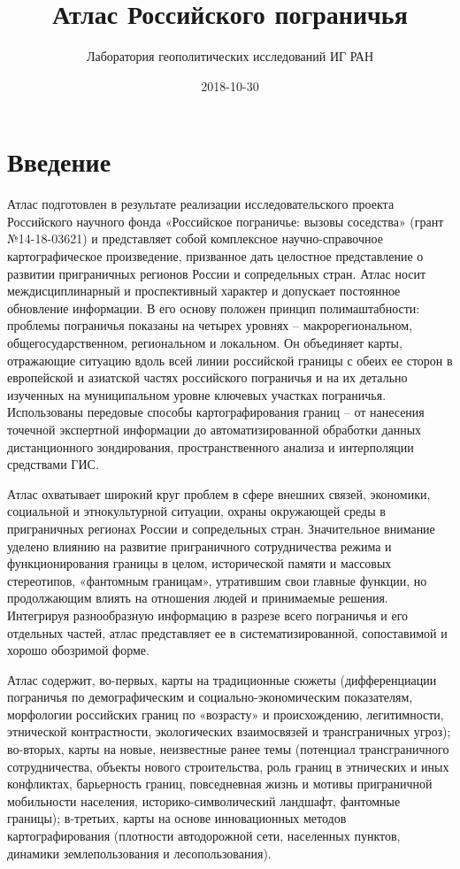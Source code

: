 \documentclass[]{book}
\title{Атлас Российского пограничья}
\author{Лаборатория геополитических исследований ИГ РАН}
\date{2018-10-30}
\begin{document}
\maketitle

{
\setcounter{tocdepth}{1}
\tableofcontents
}
\chapter*{Введение}

Атлас подготовлен в результате реализации исследовательского проекта
Российского научного фонда «Российское пограничье: вызовы соседства»
(грант №14-18-03621) и представляет собой комплексное научно-справочное
картографическое произведение, призванное дать целостное представление о
развитии приграничных регионов России и сопредельных стран. Атлас носит
междисциплинарный и проспективный характер и допускает постоянное
обновление информации. В его основу положен принцип полимаштабности:
проблемы пограничья показаны на четырех уровнях -- макрорегиональном,
общегосударственном, региональном и локальном. Он объединяет карты,
отражающие ситуацию вдоль всей линии российской границы с обеих ее
сторон в европейской и азиатской частях российского пограничья и на их
детально изученных на муниципальном уровне ключевых участках пограничья.
Использованы передовые способы картографирования границ -- от нанесения
точечной экспертной информации до автоматизированной обработки данных
дистанционного зондирования, пространственного анализа и интерполяции
средствами ГИС.

Атлас охватывает широкий круг проблем в сфере внешних связей, экономики,
социальной и этнокультурной ситуации, охраны окружающей среды в
приграничных регионах России и сопредельных стран. Значительное внимание
уделено влиянию на развитие приграничного сотрудничества режима и
функционирования границы в целом, исторической памяти и массовых
стереотипов, «фантомным границам», утратившим свои главные функции, но
продолжающим влиять на отношения людей и принимаемые решения. Интегрируя
разнообразную информацию в разрезе всего пограничья и его отдельных
частей, атлас представляет ее в систематизированной, сопоставимой и
хорошо обозримой форме.

Атлас содержит, во-первых, карты на традиционные сюжеты (дифференциации
пограничья по демографическим и социально-экономическим показателям,
морфологии российских границ по «возрасту» и происхождению,
легитимности, этнической контрастности, экологических взаимосвязей и
трансграничных угроз); во-вторых, карты на новые, неизвестные ранее темы
(потенциал трансграничного сотрудничества, объекты нового строительства,
роль границ в этнических и иных конфликтах, барьерность границ,
повседневная жизнь и мотивы приграничной мобильности населения,
историко-символический ландшафт, фантомные границы); в-третьих, карты на
основе инновационных методов картографирования (плотности автодорожной
сети, населенных пунктов, динамики землепользования и лесопользования).
\end{document}
